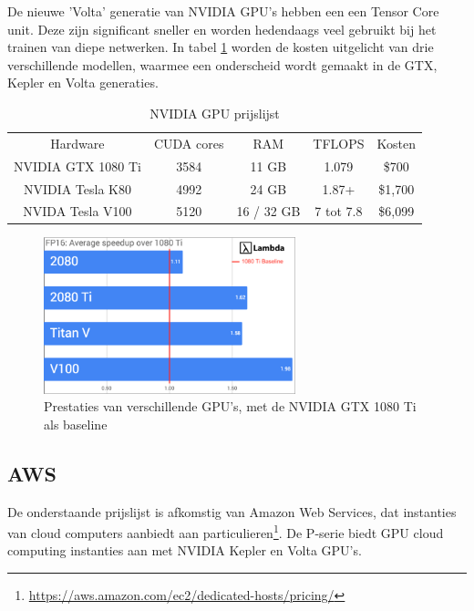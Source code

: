 De nieuwe 'Volta' generatie van NVIDIA GPU's hebben een een Tensor Core unit. Deze zijn significant sneller en worden hedendaags veel gebruikt bij het trainen van diepe netwerken. In tabel \ref{tab:gpu_prices} worden de kosten uitgelicht van drie verschillende modellen, waarmee een onderscheid wordt gemaakt in de GTX, Kepler en Volta generaties.

\begin{table}[H]
    \centering
    \begin{tabular}{c||c|c|c|c}
        Hardware & CUDA cores & RAM & TFLOPS &  Kosten \\
        NVIDIA GTX 1080 Ti & 3584 & 11 GB & 1.079 & \$700 \\
        NVIDIA Tesla K80 & 4992 &  24 GB & 1.87+ & \$1,700 \\
        NVIDA Tesla V100 & 5120 & 16 / 32 GB & 7 tot 7.8 & \$6,099 \\
    \end{tabular}
    \caption{NVIDIA GPU prijslijst}
    \label{tab:gpu_prices}
\end{table}

\begin{figure}
    \centering
    \includegraphics[width=0.65\textwidth]{figures/fp_16_lambda.png}
    \caption{Prestaties van verschillende GPU's, met de NVIDIA GTX 1080 Ti als baseline}
    \label{fig:gpu_performance}
\end{figure}

\subsection{AWS}
De onderstaande prijslijst is afkomstig van Amazon Web Services, dat instanties van cloud computers aanbiedt aan particulieren\footnote{\url{https://aws.amazon.com/ec2/dedicated-hosts/pricing/}}. De P-serie biedt GPU cloud computing instanties aan met NVIDIA Kepler en Volta GPU's.

